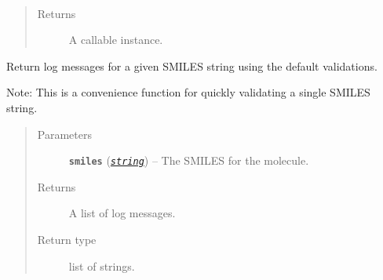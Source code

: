 \documentclass[letterpaper,10pt,english]{sphinxmanual}
\begin{document}
\begin{fulllineitems}

\begin{fulllineitems}
\label{reference/PyPretreatMol:PyPretreatMol.StandardizeMol.rmhs}
\end{fulllineitems}


\begin{fulllineitems}
\label{reference/PyPretreatMol:PyPretreatMol.StandardizeMol.uncharge}~\begin{quote}\begin{description}
\item[{Returns}] \leavevmode
A callable  instance.

\end{description}\end{quote}

\end{fulllineitems}


\end{fulllineitems}


\begin{fulllineitems}
\label{reference/PyPretreatMol:PyPretreatMol.ValidatorMol}
Return log messages for a given SMILES string using the default validations.

Note: This is a convenience function for quickly validating a single SMILES string.
\begin{quote}\begin{description}
\item[{Parameters}] \leavevmode
\textbf{\texttt{smiles}} (\href{https://docs.python.org/2/library/string.html\#module-string}{\emph{\texttt{string}}}) -- The SMILES for the molecule.

\item[{Returns}] \leavevmode
A list of log messages.

\item[{Return type}] \leavevmode
list of strings.

\end{description}\end{quote}

\end{fulllineitems}
\end{document}
